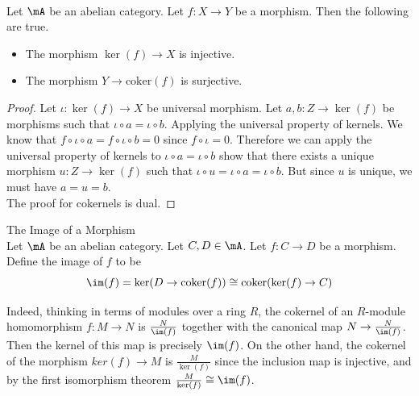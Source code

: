\documentclass[a4paper]{article}
\begin{document}
\begin{lmm}{}{}\\
Let $\mA$ be an abelian category. Let $f:X\to Y$ be a morphism. Then the following are true. 
\begin{itemize}
\item The morphism $\ker(f)\to X$ is injective. 
\item The morphism $Y\to\text{coker}(f)$ is surjective. 
\end{itemize}
\begin{proof}
Let $\iota:\ker(f)\to X$ be universal morphism. Let $a,b:Z\to\ker(f)$ be morphisms such that $\iota\circ a=\iota\circ b$. Applying the universal property of kernels. We know that $f\circ\iota\circ a=f\circ\iota\circ b=0$ since $f\circ\iota=0$. Therefore we can apply the universal property of kernels to $\iota\circ a=\iota\circ b$ show that there exists a unique morphism $u:Z\to\ker(f)$ such that $\iota\circ u=\iota\circ a=\iota\circ b$. But since $u$ is unique, we must have $a=u=b$. \\

The proof for cokernels is dual. 
\end{proof}
\end{lmm}

\begin{defn}{The Image of a Morphism}{}\\
Let $\mA$ be an abelian category. Let $C,D\in\mA$. Let $f:C\to D$ be a morphism. Define the image of $f$ to be $$\im(f)=\ker(D\to\text{coker}(f))\cong\text{coker}(\ker(f)\to C)$$
\end{defn}

Indeed, thinking in terms of modules over a ring $R$, the cokernel of an $R$-module homomorphism $f:M\to N$ is $\frac{N}{\im(f)}$ together with the canonical map $N\to\frac{N}{\im(f)}$. Then the kernel of this map is precisely $\im(f)$. On the other hand, the cokernel of the morphism $ker(f)\to M$ is $\frac{M}{\ker(f)}$ since the inclusion map is injective, and by the first isomorphism theorem $\frac{M}{\ker(f)}\cong\im(f)$. 
\end{document}
